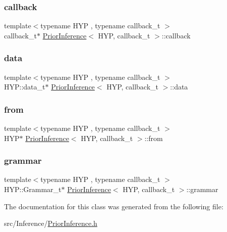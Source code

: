 \subsubsection{\texorpdfstring{callback}{callback}}
{\footnotesize\ttfamily template$<$typename H\+YP , typename callback\+\_\+t $>$ \\
callback\+\_\+t$\ast$ \hyperlink{class_prior_inference}{Prior\+Inference}$<$ H\+YP, callback\+\_\+t $>$\+::callback}

\mbox{\label{class_prior_inference_a537a489d953992aca5327899548df8ac}} 
\subsubsection{\texorpdfstring{data}{data}}
{\footnotesize\ttfamily template$<$typename H\+YP , typename callback\+\_\+t $>$ \\
H\+Y\+P\+::data\+\_\+t$\ast$ \hyperlink{class_prior_inference}{Prior\+Inference}$<$ H\+YP, callback\+\_\+t $>$\+::data}

\mbox{\label{class_prior_inference_ae583f068334550a1e73fdf453359b7d3}} 
\subsubsection{\texorpdfstring{from}{from}}
{\footnotesize\ttfamily template$<$typename H\+YP , typename callback\+\_\+t $>$ \\
H\+YP$\ast$ \hyperlink{class_prior_inference}{Prior\+Inference}$<$ H\+YP, callback\+\_\+t $>$\+::from}

\mbox{\label{class_prior_inference_a43d11fa29f7eba36eebf1de72db3afc4}} 
\subsubsection{\texorpdfstring{grammar}{grammar}}
{\footnotesize\ttfamily template$<$typename H\+YP , typename callback\+\_\+t $>$ \\
H\+Y\+P\+::\+Grammar\+\_\+t$\ast$ \hyperlink{class_prior_inference}{Prior\+Inference}$<$ H\+YP, callback\+\_\+t $>$\+::grammar}



The documentation for this class was generated from the following file\+:\begin{DoxyCompactItemize}
\item 
src/\+Inference/\hyperlink{_prior_inference_8h}{Prior\+Inference.\+h}\end{DoxyCompactItemize}
